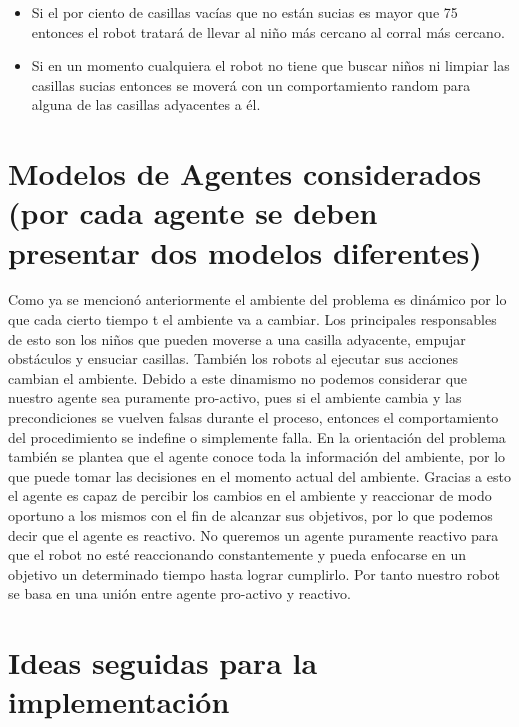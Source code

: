 \documentclass[a4paper,10pt]{article}
\begin{document}
\begin{itemize}
\begin{itemize}
			\item Si el por ciento de casillas vac\'ias que no est\'an sucias es mayor que 75 entonces el robot tratar\'a de llevar al ni\~no m\'as cercano al corral m\'as cercano.
			
			\item Si en un momento cualquiera el robot no tiene que buscar ni\~nos ni limpiar las casillas sucias entonces se mover\'a con un comportamiento random para alguna de las casillas adyacentes a \'el. 
		\end{itemize} 
		
\end{itemize}




\section*{Modelos de Agentes considerados (por cada agente se deben presentar dos modelos diferentes)}
Como ya se mencion\'o anteriormente el ambiente del problema es din\'amico por lo que cada cierto tiempo t el ambiente va a cambiar. Los principales responsables de esto son los ni\~nos que pueden moverse a una casilla adyacente, empujar obst\'aculos y ensuciar casillas. Tambi\'en los robots al ejecutar sus acciones cambian el ambiente. Debido a este dinamismo no podemos considerar que nuestro agente sea puramente pro-activo, pues si el ambiente cambia y las precondiciones se vuelven falsas durante el proceso, entonces el comportamiento del procedimiento se indefine o simplemente falla. En la orientaci\'on del problema tambi\'en se plantea que el agente conoce toda la informaci\'on del ambiente, por lo que puede tomar las decisiones en el momento actual del ambiente. Gracias a esto el agente es capaz de percibir los cambios en el ambiente y reaccionar de modo oportuno a los mismos
con el fin de alcanzar sus objetivos, por lo que podemos decir que el agente es reactivo. No queremos un agente puramente reactivo para que el robot no est\'e reaccionando constantemente y pueda enfocarse en un objetivo un determinado tiempo hasta lograr cumplirlo. Por tanto nuestro robot se basa en una uni\'on entre agente pro-activo y reactivo. 

 \section*{Ideas seguidas para la implementación}
\end{document}
